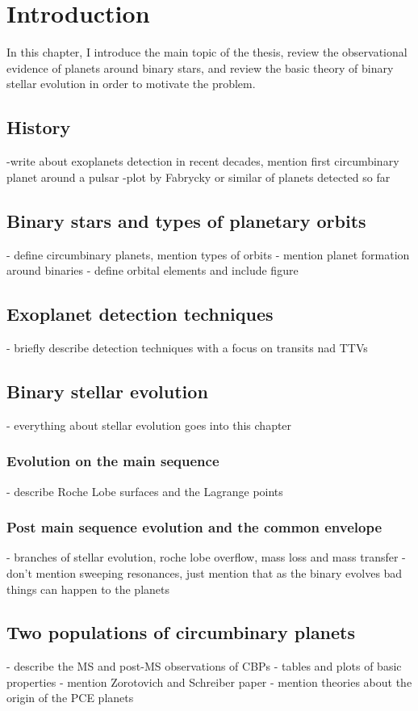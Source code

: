 \chapter{Introduction}\label{ch:introduction}
In this chapter, I introduce the main topic of the thesis, review the 
observational evidence of planets around binary stars, and review the 
basic theory of binary stellar evolution in order to motivate the problem.

\section{History}
\label{sec:History}
-write about exoplanets detection in recent
decades, mention first circumbinary planet around a pulsar
-plot by Fabrycky or similar of planets detected so far

\section{Binary stars and types of planetary orbits}
\label{sec:Binary_stars_and_types_of_planetary_orbits}
- define circumbinary planets, mention types of orbits
- mention planet formation around binaries
- define orbital elements and include figure

\section{Exoplanet detection techniques}
\label{sec:Exoplanet detection techniques}
- briefly describe detection techniques with a 
focus on transits nad TTVs

\section{Binary stellar evolution}
\label{sec:Binary stellar evolution}
- everything about stellar evolution goes into this chapter

\subsection{Evolution on the main sequence}
\label{sub:Evolution on the main sequence}
- describe Roche Lobe surfaces and the Lagrange points

\subsection{Post main sequence evolution and the common envelope}
\label{sub:Post main sequence evolution and the common envelope}
- branches of stellar evolution, roche lobe overflow, mass loss
and mass transfer
- don't mention sweeping resonances, just mention that as the binary
evolves bad things can happen to the planets

\section{Two populations of circumbinary planets}
\label{sec:Two populations of circumbinary planets}
- describe the MS and post-MS observations of CBPs
- tables and plots of basic properties
- mention Zorotovich and Schreiber paper
- mention theories about the origin of the PCE planets
